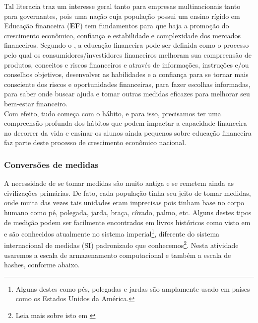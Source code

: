  Tal literacia traz um interesse geral tanto para empresas multinacionais tanto para governantes, pois uma nação cuja população possui um ensino rígido em Educação financeira (\textbf{EF}) tem fundamentos para que haja a promoção do crescimento econômico, confiança e estabilidade e complexidade dos mercados financeiros.  Segundo o \cite{OCDE}, a educação financeira pode ser definida como o processo pelo qual os consumidores/investidores financeiros melhoram sua compreensão de produtos, conceitos e riscos financeiros e através de informações, instruções e/ou conselhos objetivos, desenvolver as habilidades e a confiança para se tornar mais consciente dos riscos e oportunidades financeiras, para fazer escolhas informadas, para saber onde buscar ajuda e tomar outras medidas eficazes para melhorar seu bem-estar financeiro. \\	

Com efeito, tudo começa com o hábito, e para isso, precisamos
ter uma compreensão profunda dos hábitos que podem impactar a capacidade financeira no decorrer da vida e ensinar os alunos ainda pequenos sobre educação financeira faz parte deste processo de crescimento econômico nacional.

\subsubsection{Conversões de medidas} 
A necessidade de se tomar medidas são muito antiga e se remetem ainda as civilizações primárias. De fato, cada população tinha seu jeito de tomar medidas, onde muita das vezes tais unidades eram imprecisas pois tinham base no corpo humano como pé, polegada, jarda, braça, côvado, palmo, etc. Alguns destes tipos de medição podem ser facilmente encontrados em livros históricos como visto em \cite{CUNHA} e são conhecidos atualmente no sistema imperial\footnote{Alguns destes como  pés, polegadas e jardas são amplamente usado em países como os Estados Unidos da América.}, diferente do sistema internacional de medidas (SI) padronizado que conhecemos\footnote{Leia mais sobre isto em \cite{LEGER}}. Nesta atividade usaremos a escala de armazenamento computacional  e também a escala de hashes, conforme abaixo. 

